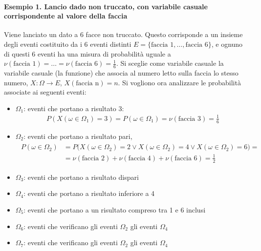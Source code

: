 \documentclass[letterpaper,10pt,italian]{jupyterBook}
\begin{document}
\paragraph{Esempio 1. Lancio dado non truccato, con variabile casuale corrispondente al valore della faccia}
\label{\detokenize{ch/statistics/random_variables_definition:esempio-1-lancio-dado-non-truccato-con-variabile-casuale-corrispondente-al-valore-della-faccia}}
\sphinxAtStartPar
Viene lanciato un dato a 6 facce non truccato. Questo corrisponde a un insieme degli eventi costituito da i 6 eventi distinti \(E = \{ \text{faccia 1}, \dots, \text{faccia 6} \}\), e ognuno di questi 6 eventi ha una misura di probabilità uguale a \(\nu(\text{faccia 1}) = \dots = \nu(\text{faccia 6}) = \frac{1}{6}\). Si sceglie come variabile casuale la variabile casuale (la funzione) che associa al numero letto sulla faccia lo stesso numero, \(X: \Omega \rightarrow E\), \(X(\text{faccia n}) = n\). Si vogliono ora analizzare le probabilità associate ai seguenti eventi:
\begin{itemize}
\item {} 
\sphinxAtStartPar
\(\Omega_1\): eventi che portano a risultato 3:
\begin{equation*}
\begin{split}P(X(\omega \in \Omega_1) = 3) = P(\omega \in \Omega_1) = \nu(\text{faccia 3}) = \frac{1}{6}\end{split}
\end{equation*}
\item {} 
\sphinxAtStartPar
\(\Omega_2\): eventi che portano a risultato pari,
\begin{equation*}
\begin{split}\begin{aligned}
    P(\omega \in \Omega_2) 
    & = P\big(X(\omega \in \Omega_2) = 2 \lor X(\omega \in \Omega_2) = 4 \lor X(\omega \in \Omega_2) = 6\big) = \\
    & = \nu(\text{faccia 2}) + \nu(\text{faccia 4}) + \nu(\text{faccia 6}) = \frac{1}{2}
  \end{aligned}\end{split}
\end{equation*}
\item {} 
\sphinxAtStartPar
\(\Omega_3\): eventi che portano a risultato dispari

\item {} 
\sphinxAtStartPar
\(\Omega_4\): eventi che portano a risultato inferiore a 4

\item {} 
\sphinxAtStartPar
\(\Omega_5\): eventi che portano a un risultato compreso tra 1 e 6 inclusi

\item {} 
\sphinxAtStartPar
\(\Omega_6\): eventi che verificano gli eventi \(\Omega_2\)  gli eventi \(\Omega_4\)

\item {} 
\sphinxAtStartPar
\(\Omega_7\): eventi che verificano gli eventi \(\Omega_2\)  gli eventi \(\Omega_4\)

\end{itemize}
\end{document}
